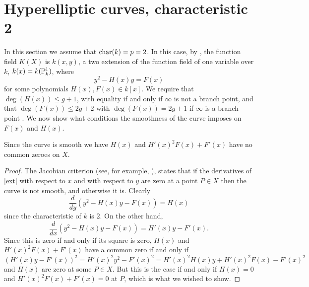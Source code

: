 \section{Hyperelliptic curves, characteristic 2}

In this section we assume that $\operatorname{char}(k) = p  =2$.   
In this case, by \cite[Prop. 7.4.24]{liu}, the function field $K(X)$ is $k(x,y)$, a two extension of the function field of one variable over $k$, $k(x) = k({\mathbb P}_k^1)$, where
    \begin{equation}\label{ext}
    y^2 - H(x)y = F(x)
    \end{equation}
for some polynomials $H(x), F(x)\in k[x]$.
We require that $\deg(H(x)) \leq g+1$, with equality if and only if $\infty$ is not a branch point, and that $\deg(F(x)) \leq 2g+2$ with $\deg(F(x)) = 2g+1$ if $\infty$ is a branch point  \cite[Prop.\ 7.4.24]{liu}.
We now show what conditions the smoothness of the curve imposes on $F(x)$ and $H(x)$.



\begin{lem}\label{smoothness}
    Since the curve is smooth we have $H(x)$ and $H'(x)^2 F(x) + F'(x)$ have no common zeroes on $X$.
    \end{lem}
    \begin{proof}
    The Jacobian criterion (see, for example, \cite[Thm. 4.2.19]{liu}), states that if the derivatives of \eqref{ext} with respect to $x$ and with respect to $y$ are zero at a point $P\in X$ then the curve is not smooth, and otherwise it is.
    Clearly
        \[
        \frac{d}{dy} (y^2 -H(x)y -F(x)) = H(x)
        \]
    since the characteristic of $k$ is 2.
    On the other hand,
        \[
        \frac{d}{dx} (y^2 - H(x)y -F(x)) = H'(x)y - F'(x).
        \]
    Since this is zero if and only if its square is zero, $H(x)$ and $H'(x)^2 F(x) + F'(x)$ have a common zero if and only if
        \[
        (H'(x)y-F'(x))^2 = H'(x)^2y^2 -F'(x)^2 = H'(x)^2H(x)y + H'(x)^2F(x) - F'(x)^2
        \]
    and $H(x)$ are zero at some $P\in X$.
    But this is the case if and only if $H(x) = 0$ and $H'(x)^2F(x) + F'(x) = 0$ at $P$, which is what we wished to show.
    \end{proof}

